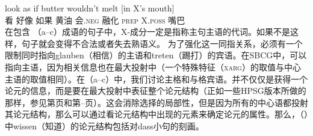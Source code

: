 \gll look as if butter wouldn't melt [in X's mouth]\\
看 好像 如果 黄油 会.\textsc{neg} 融化 \spacebr{}\textsc{prep} X.\textsc{poss} 嘴巴\\
\zl
在包含 （a--c）成语的句子中，X-成分一定是指称主句主语的代词。如果不是这样，句子就会变得不合法或者失去熟语义。
\eal
{}
\zl
为了强化这一同指关系，必须有一个限制同时指向glauben（相信）的主语和treten（踢打）的宾语。在SBCG中，可以指向主语，因为相关信息也在最大投射中（一个特殊特征（\textsc{xarg}）的取值与中心主语的取值相同）。在（a--c）中，我们讨论主格和与格宾语。并不仅仅是获得一个论元的信息，而是要在最大投射中表征整个论元结构（正如一些HPSG版本所做的那样，参见第\pageref{Seite-Bender-Wambaya}页和第\pageref{page-Bender-Wambaya-two}--\pageref{page-non-cancellation-end}页）。这会消除选择的局部性，但是因为所有的中心语都投射其论元结构，那么可以通过看论元结构中出现的元素来确定论元的属性。那么，（）中wissen（知道）的论元结构包括对dass小句的刻画。
